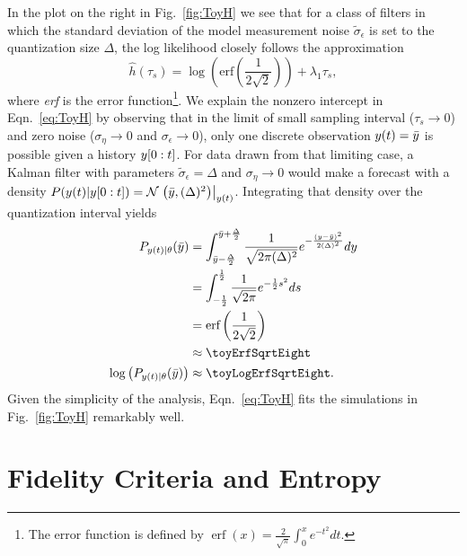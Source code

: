 In the plot on the right in Fig.~\ref{fig:ToyH} we see that for a
class of filters in which the standard deviation of the model
measurement noise $\tilde \sigma_\epsilon$ is set to the quantization
size $\Delta$, the log likelihood closely follows the approximation
\begin{equation}
  \label{eq:ToyH}
  \hat h(\tau_s) = \log\left(\text{erf}\left(\frac{1}{2\sqrt{2}}\right)\right)
  + \lambda_1 \tau_s,
\end{equation}
where \emph{erf} is the error function\footnote{The error function is
  defined by $\operatorname{erf}(x) = \frac{2}{\sqrt{\pi}}\int_0^x
  e^{-t^2} dt$.}.  We explain the nonzero intercept in
Eqn.~\eqref{eq:ToyH} by observing that in the limit of small sampling
interval ($\tau_s \rightarrow 0$) and zero noise ($\sigma_\eta
\rightarrow 0$ and $\sigma_\epsilon \rightarrow 0$), only one discrete
observation ${y}{(t)}=\bar y$ is possible given a history
$y[0:t]$.  For data drawn from that limiting case, a Kalman
filter with parameters $\tilde \sigma_\epsilon = \Delta$ and
$\sigma_\eta \rightarrow 0$ would make a forecast with a density
$P({y}{(t)}|y[0:t]) = {\mathcal{N}}\left.\left(\bar
  y,(\Delta)^2\right)\right|_{{y}{(t)}}$.  Integrating that density over the
quantization interval yields
 \begin{align*}
   P_{\ti{y}{t}|\theta}(\bar y) &= \int_{\bar y -
     \frac{\Delta}{2}}^{\bar y + \frac{\Delta}{2}} \frac{1}{\sqrt{2\pi
       (\Delta)^2}}e^{-\frac{(y-\bar
       y)^2}{2(\Delta)^2}} dy\\
   &= \int_{-\frac{1}{2}}^{\frac{1}{2}} \frac{1}{\sqrt{2\pi
     }}e^{-\frac{1}{2}s^2} ds\\
   &= \text{erf} \left( \frac{1}{2\sqrt{2}}\right) \\
   &\approx \toyErfSqrtEight \\
   \log \left( P_{\ti{y}{t}|\theta}(\bar y) \right) &\approx \toyLogErfSqrtEight.
 \end{align*}
Given the simplicity of the analysis, Eqn.~\eqref{eq:ToyH} fits the
simulations in Fig.~\ref{fig:ToyH} remarkably well.


\section{Fidelity Criteria and Entropy}
\label{sec:fidelity}

